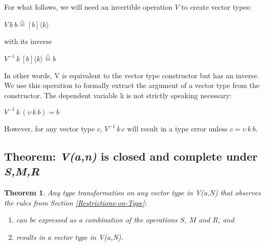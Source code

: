 \documentclass{article}
\newtheorem{theorem}{Theorem}
\begin{document}
For what follows, we will need an invertible operation $V$ to create
vector types:

$V\, k\, b\overset{{\scriptscriptstyle \triangle}}{=}[b]\langle k\rangle$

with its inverse

$V^{-1}\, k\,[b]\langle k\rangle\overset{{\scriptscriptstyle \triangle}}{=}b$

In other words, V is equivalent to the vector type constructor but
has an inverse. We use this operation to formally extract the argument
of a vector type from the constructor. The dependent variable k is
not strictly speaking necessary:

$V^{-1}\, k\,(\upsilon\, k\, b)=b$

However, for any vector type $c$, $V^{-1}\, k\, c$ will result in
a type error unless $c=\upsilon\, k\, b$. 


\subsection{Theorem: \emph{V(a,n)} is closed and complete under \emph{S,M,R}}

\begin{theorem}

Any type transformation on any vector type in \emph{V(a,N)} that observes
the rules from Section \ref{Restrictions-on-Type}:
\begin{enumerate}
\item can be expressed as a combination of the operations $S$, $M$ and
$R$, and 
\item results in a vector type in \emph{V(a,N).}
\end{enumerate}
\end{theorem}
\end{document}
